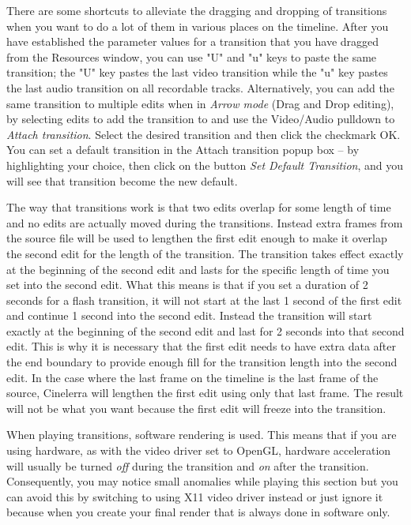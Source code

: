 There are some shortcuts to alleviate the dragging and dropping of transitions when you want to do a lot of them in various places on the timeline. After you have established the parameter values for a transition that you have dragged from the Resources window, you can use "U" and "u" keys to paste the same transition;
the "U" key pastes the last video transition while the "u" key pastes the last audio transition on all recordable tracks. 
Alternatively, you can add the same transition to multiple edits when in \textit{Arrow mode} (Drag and Drop editing), by selecting edits to add the transition to and use the Video/Audio pulldown to \textit{Attach transition}. Select the desired transition and then click the checkmark OK. You can set a default transition in the Attach transition popup box -- by highlighting your choice, then click on the button \textit{Set Default Transition}, and you will see that transition become the new default.

The way that transitions work is that two edits overlap for some length of time and no edits are actually moved during the transitions.
Instead extra frames from the source file will be used to lengthen the first edit enough to make it overlap the second edit for the length of the transition. The transition takes effect exactly at the beginning of the second edit and lasts for the specific length of time you set into the second edit. 
What this means is that if you set a duration of 2 seconds for a flash transition, it will not start at the last 1 second of the first edit and continue 1 second into the second edit. Instead the transition will start exactly at the beginning of the second edit and last for 2 seconds into that second edit. 
This is why it is necessary that the first edit needs to have extra data after the end boundary to provide enough fill for the transition length into the second edit.
In the case where the last frame on the timeline is the last frame of the source, Cinelerra will lengthen the first edit using only that last frame.  The result will not be what you want because the first edit will freeze into the transition.

When playing transitions, software rendering is used.  This means that if you are using hardware, as with the video driver set to OpenGL, hardware acceleration will usually be turned \textit{off} during the transition and \textit{on} after the transition. Consequently, you may notice small anomalies while playing this section but you can avoid this by switching to using X11 video driver instead or just ignore it because when you create your final render that is always done in software only.
    
